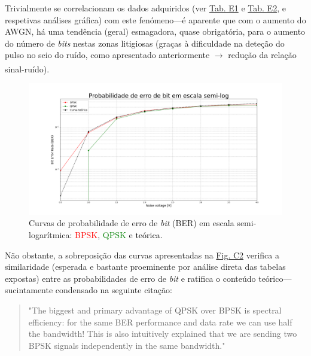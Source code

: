 Trivialmente se correlacionam os dados adquiridos (ver \hyperref[tab:bpsk]{Tab. E1} e \hyperref[tab:qpsk]{Tab. E2}, e respetivas análises gráfica) com este fenómeno---é aparente que com o aumento do AWGN, há uma tendência (geral) esmagadora, quase obrigatória, para o aumento do número de \textit{bits} nestas zonas litigiosas (graças à dificuldade na deteção do pulso no seio do ruído, como apresentado anteriormente $\xrightarrow[]{}$ redução da relação sinal-ruído).

\begin{figure}[H]
    \centering
    \includegraphics[width=1\linewidth]{img/conclusao/BER_plot.png}
    \caption{Curvas de probabilidade de erro de \textit{bit} (BER) em escala semi-logarítmica: \textcolor{red}{BPSK}, \textcolor{green}{QPSK} e \textcolor{black}{teórica}\protect\footnotemark[12].}
    \label{fig:BERcurves}
\end{figure}


Não obstante, a sobreposição das curvas apresentadas na \hyperref[fig:BERcurves]{Fig. C2} verifica a similaridade (esperada e bastante proeminente por análise direta das tabelas expostas) entre as probabilidades de erro de \textit{bit} e ratifica o conteúdo teórico---sucintamente condensado na seguinte citação:
\begin{quote}
    "The biggest and primary advantage of QPSK over BPSK is spectral efficiency: for the same BER performance and data rate we can use half the bandwidth! This is also intuitively explained that we are sending two BPSK signals independently in the same bandwidth."\cite{jstraughjstraugh}
\end{quote}